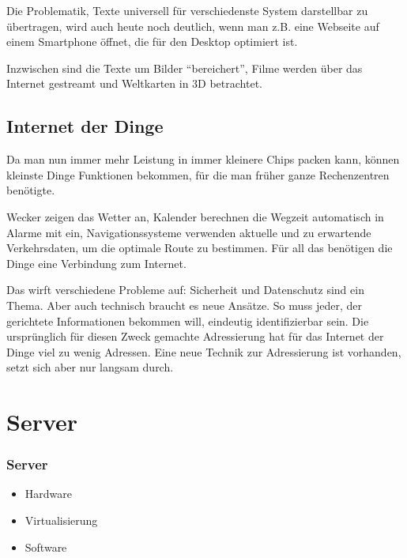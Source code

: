     Die Problematik, Texte universell für verschiedenste System darstellbar zu übertragen, wird auch heute noch deutlich, wenn man z.B. eine Webseite auf einem Smartphone öffnet, die für den Desktop optimiert ist.

    Inzwischen sind die Texte um Bilder ``bereichert'', Filme werden über das Internet gestreamt und Weltkarten in 3D betrachtet.

  \subsection{Internet der Dinge}
    Da man nun immer mehr Leistung in immer kleinere Chips packen kann, können kleinste Dinge Funktionen bekommen, für die man früher ganze Rechenzentren benötigte.

    Wecker zeigen das Wetter an, Kalender berechnen die Wegzeit automatisch in Alarme mit ein, Navigationssysteme verwenden aktuelle und zu erwartende Verkehrsdaten, um die optimale Route zu bestimmen. Für all das benötigen die Dinge eine Verbindung zum Internet.

    Das wirft verschiedene Probleme auf: Sicherheit und Datenschutz sind ein Thema. Aber auch technisch braucht es neue Ansätze. So muss jeder, der gerichtete Informationen bekommen will, eindeutig identifizierbar sein. Die ursprünglich für diesen Zweck gemachte Adressierung hat für das Internet der Dinge viel zu wenig Adressen. Eine neue Technik zur Adressierung ist vorhanden, setzt sich aber nur langsam durch.


\section{Server}
	\begin{frame}
			\frametitle<beamer>{Server}
			\begin{itemize}
				\item Hardware
				\item Virtualisierung
	     \item Software
	  \end{itemize}
	\end{frame}
    
